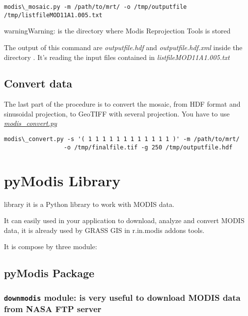 \documentclass[a4paper,11pt,oneside]{sphinxmanual}
\begin{document}
\begin{Verbatim}[commandchars=\\\{\}]
modis\_mosaic.py -m /path/to/mrt/ -o /tmp/outputfile /tmp/listfileMOD11A1.005.txt
\end{Verbatim}

\begin{notice}{warning}{Warning:}
 is the directory where Modis Reprojection Tools is stored
\end{notice}

The output of this command are \emph{outputfile.hdf} and \emph{outputfile.hdf.xml} inside the
directory . It's reading the input files contained in \emph{listfileMOD11A1.005.txt}


\section{Convert data}
\label{examples/full_example:convert-data}
The last part of the procedure is to convert the mosaic, from HDF format and sinusoidal
projection, to GeoTIFF with several projection. You have to use {\hyperref[scripts/modis_convert::doc]{\emph{modis\_convert.py}}}

\begin{Verbatim}[commandchars=\\\{\}]
modis\_convert.py -s '( 1 1 1 1 1 1 1 1 1 1 1 1 )' -m /path/to/mrt/
                 -o /tmp/finalfile.tif -g 250 /tmp/outputfile.hdf
\end{Verbatim}


\chapter{pyModis Library}
\label{pymodis/modules:pymodis-library}\label{pymodis/modules::doc}
 library it is a Python library to work with MODIS data.

It can easily used in your application to download, analyze and
convert MODIS data, it is already used by GRASS GIS in r.in.modis
addons tools.

It is compose by three module:


\section{pyModis Package}
\label{pymodis/pymodis:pymodis-package}\label{pymodis/pymodis::doc}

\subsection{\texttt{downmodis} module: is very useful to download MODIS data from NASA FTP server}
\label{pymodis/pymodis:downmodis-module-is-very-useful-to-download-modis-data-from-nasa-ftp-server}\label{pymodis/pymodis:module-pymodis.downmodis}
\end{document}
